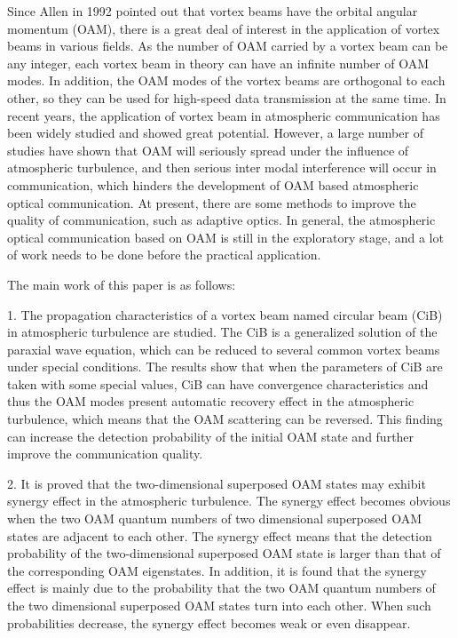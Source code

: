 \documentclass[master]{thesis-uestc}
\begin{document}
\begin{englishabstract}
Since Allen in 1992 pointed out that vortex beams have the orbital angular momentum (OAM), there is a great deal of interest in the application of vortex beams in various fields. As the number of OAM carried by a vortex beam can be any integer, each vortex beam in theory can have an infinite number of OAM modes. In addition, the OAM modes of the vortex beams are orthogonal to each other, so they can be used for high-speed data transmission at the same time. In recent years, the application of vortex beam in atmospheric communication has been widely studied and showed great potential. However, a large number of studies have shown that OAM will seriously spread under the influence of atmospheric turbulence, and then serious inter modal interference will occur in communication, which hinders the development of OAM based atmospheric optical communication. At present, there are some methods to improve the quality of communication, such as adaptive optics. In general, the atmospheric optical communication based on OAM is still in the exploratory stage, and a lot of work needs to be done before the practical application.

The main work of this paper is as follows:

1. The propagation characteristics of a vortex beam named circular beam (CiB) in atmospheric turbulence are studied. The CiB is a generalized solution of the paraxial wave equation, which can be reduced to several common vortex beams under special conditions. The results show that when the parameters of CiB are taken with some special values, CiB can have convergence characteristics and thus the OAM modes present automatic recovery effect in the atmospheric turbulence, which means that the OAM scattering can be reversed. This finding can increase the detection probability of the initial OAM state and further improve the communication quality.

2. It is proved that the two-dimensional superposed OAM states may exhibit synergy effect in the atmospheric turbulence. The synergy effect becomes obvious when the two OAM quantum numbers of two dimensional superposed OAM states are adjacent to each other. The synergy effect means that the detection probability of the two-dimensional superposed OAM state is larger than that of the corresponding OAM eigenstates. In addition, it is found that the synergy effect is mainly due to the probability that the two OAM quantum numbers of the two dimensional superposed OAM states turn into each other. When such probabilities decrease, the synergy effect becomes weak or even disappear.


\end{englishabstract}
\end{document}

